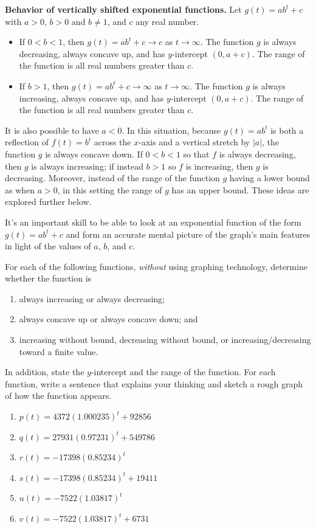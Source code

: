 \documentclass[nooutcomes]{ximera}
\begin{document}
\begin{callout}
\textbf{\Large Behavior of vertically shifted exponential functions.}
Let $g(t) = ab^t + c$ with $a \gt 0$, $b \gt 0$ and $b \ne 1$, and $c$ any real number.
\begin{itemize}
\item If $0 \lt b \lt 1$, then $g(t) = ab^t + c \to c$ as $t \to \infty$.  The function $g$ is always decreasing, always concave up, and has $y$-intercept $(0,a+c)$.  The range of the function is all real numbers greater than $c$.
\item If $b \gt 1$, then $g(t) = ab^t + c \to \infty$ as $t \to \infty$.  The function $g$ is always increasing, always concave up, and has $y$-intercept $(0,a+c)$.  The range of the function is all real numbers greater than $c$.
\end{itemize}
\end{callout}


It is also possible to have $a \lt 0$.  In this situation, because $g(t) = ab^t$ is both a reflection of $f(t) = b^t$ across the $x$-axis and a vertical stretch by $|a|$, the function $g$ is always concave down.  If $0 \lt b \lt 1$ so that $f$ is always decreasing, then $g$ is always increasing; if instead $b \gt 1$ so $f$ is increasing, then $g$ is decreasing.  Moreover, instead of the range of the function $g$ having a lower bound as when $a \gt 0$, in this setting the range of $g$ has an upper bound.  These ideas are explored further below.

It's an important skill to be able to look at an exponential function of the form $g(t) = ab^t + c$ and form an accurate mental picture of the graph's main features in light of the values of $a$, $b$, and $c$.

\begin{exploration}
For each of the following functions, \emph{without} using graphing technology, determine whether the function is
\begin{enumerate}[label=\roman*.]
\item always increasing or always decreasing;
\item always concave up or always concave down; and
\item increasing without bound, decreasing without bound, or increasing/decreasing toward a finite value.
\end{enumerate}
In addition, state the $y$-intercept and the range of the function.  For each function, write a sentence that explains your thinking and sketch a rough graph of how the function appears.
\begin{enumerate}[label=\alph*.]
\item $p(t) = 4372 (1.000235)^t + 92856$
\item $q(t) = 27931 (0.97231)^t + 549786$
\item $r(t) = -17398 (0.85234)^t$
\item $s(t) = -17398 (0.85234)^t + 19411$%
\item $u(t) = -7522 (1.03817)^t$%
\item $v(t) = -7522 (1.03817)^t + 6731$%
\end{enumerate}
\end{exploration}
\end{document}
